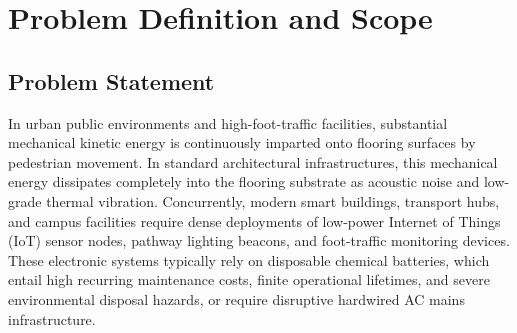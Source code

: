 \chapter{Problem Definition and Scope}

\section{Problem Statement}
In urban public environments and high-foot-traffic facilities, substantial mechanical kinetic energy is continuously imparted onto flooring surfaces by pedestrian movement. In standard architectural infrastructures, this mechanical energy dissipates completely into the flooring substrate as acoustic noise and low-grade thermal vibration. Concurrently, modern smart buildings, transport hubs, and campus facilities require dense deployments of low-power Internet of Things (IoT) sensor nodes, pathway lighting beacons, and foot-traffic monitoring devices. These electronic systems typically rely on disposable chemical batteries, which entail high recurring maintenance costs, finite operational lifetimes, and severe environmental disposal hazards, or require disruptive hardwired AC mains infrastructure.

